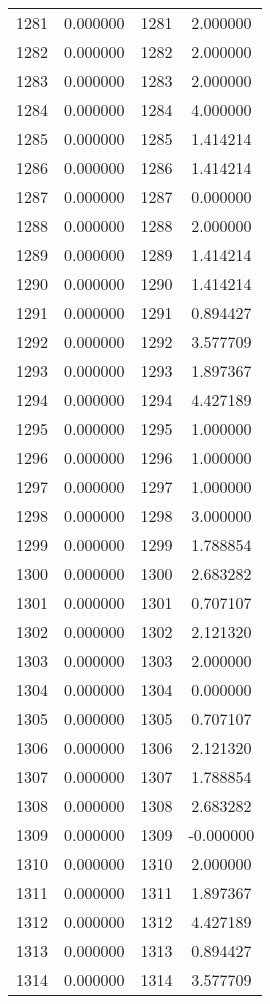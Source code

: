 \documentclass[12pt]{article}
\begin{document}
\begin{longtable}{@{}cccc@{}}
1281 & 0.000000 & 1281 & 2.000000 \\
1282 & 0.000000 & 1282 & 2.000000 \\
1283 & 0.000000 & 1283 & 2.000000 \\
1284 & 0.000000 & 1284 & 4.000000 \\
1285 & 0.000000 & 1285 & 1.414214 \\
1286 & 0.000000 & 1286 & 1.414214 \\
1287 & 0.000000 & 1287 & 0.000000 \\
1288 & 0.000000 & 1288 & 2.000000 \\
1289 & 0.000000 & 1289 & 1.414214 \\
1290 & 0.000000 & 1290 & 1.414214 \\
1291 & 0.000000 & 1291 & 0.894427 \\
1292 & 0.000000 & 1292 & 3.577709 \\
1293 & 0.000000 & 1293 & 1.897367 \\
1294 & 0.000000 & 1294 & 4.427189 \\
1295 & 0.000000 & 1295 & 1.000000 \\
1296 & 0.000000 & 1296 & 1.000000 \\
1297 & 0.000000 & 1297 & 1.000000 \\
1298 & 0.000000 & 1298 & 3.000000 \\
1299 & 0.000000 & 1299 & 1.788854 \\
1300 & 0.000000 & 1300 & 2.683282 \\
1301 & 0.000000 & 1301 & 0.707107 \\
1302 & 0.000000 & 1302 & 2.121320 \\
1303 & 0.000000 & 1303 & 2.000000 \\
1304 & 0.000000 & 1304 & 0.000000 \\
1305 & 0.000000 & 1305 & 0.707107 \\
1306 & 0.000000 & 1306 & 2.121320 \\
1307 & 0.000000 & 1307 & 1.788854 \\
1308 & 0.000000 & 1308 & 2.683282 \\
1309 & 0.000000 & 1309 & -0.000000 \\
1310 & 0.000000 & 1310 & 2.000000 \\
1311 & 0.000000 & 1311 & 1.897367 \\
1312 & 0.000000 & 1312 & 4.427189 \\
1313 & 0.000000 & 1313 & 0.894427 \\
1314 & 0.000000 & 1314 & 3.577709 \\

\end{longtable}
\end{document}
